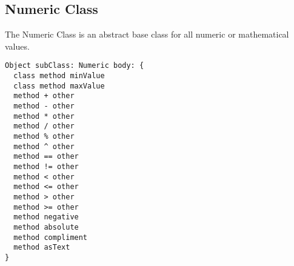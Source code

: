 \subsection{Numeric Class}

The Numeric Class is an abstract base class for all numeric or mathematical values.

\begin{lstlisting}
Object subClass: Numeric body: {
  class method minValue
  class method maxValue
  method + other
  method - other
  method * other
  method / other
  method % other
  method ^ other
  method == other
  method != other
  method < other
  method <= other
  method > other
  method >= other
  method negative
  method absolute
  method compliment
  method asText
}
\end{lstlisting}